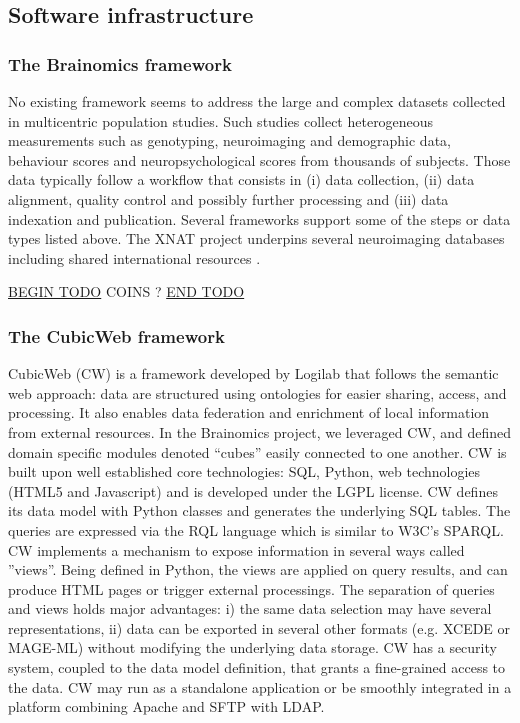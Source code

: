 \documentclass[review]{elsarticle}
\begin{document}
\subsection{Software infrastructure}

\subsubsection{The Brainomics framework}

No existing framework seems to address the large and complex datasets collected in multicentric population studies. Such studies collect heterogeneous measurements such as genotyping, neuroimaging and demographic data, behaviour scores and neuropsychological scores from thousands of subjects. Those data typically
follow a workflow that consists in (i) data collection, (ii) data alignment, quality control and possibly further processing and (iii) data indexation and publication. Several frameworks support some of the steps or data types listed above. The XNAT project \cite{XNAT2007} underpins several neuroimaging databases including shared international resources \cite{HBP2012}.

\underline{BEGIN TODO}
COINS ?
\underline{END TODO}


\subsubsection{The CubicWeb framework} CubicWeb (CW) is a framework developed by Logilab that follows the semantic web approach: data are structured using ontologies for easier sharing, access, and processing. It also enables data federation and enrichment of local information from external resources. In the Brainomics project, we leveraged CW, and defined domain specific modules denoted ``cubes'' easily connected to one another. CW is built upon well established core technologies: SQL, Python, web technologies (HTML5 and Javascript) and is developed under the LGPL license. CW defines its data model with Python classes and generates the underlying SQL tables. The queries are expressed via the RQL language which is similar to W3C's SPARQL. CW implements a mechanism to expose information in several ways called ”views”. Being defined in Python, the views are applied on query results, and can produce HTML pages or trigger external processings. The separation of queries and views holds major advantages: i) the same data selection may have several representations, ii) data can be exported in several other formats (e.g. XCEDE or MAGE-ML) without modifying the underlying data storage. CW has a security system, coupled to the data model definition, that grants a fine-grained access to the data. CW may run as a standalone application or be smoothly integrated in a platform combining Apache and SFTP with LDAP.
\end{document}

